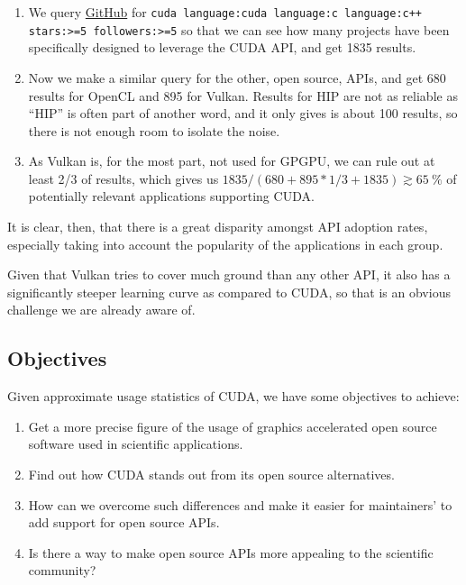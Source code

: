 \documentclass[11pt, conference, onecolumn, final]{IEEEtran}
\begin{document}
\begin{enumerate}
    \item We query \href{https://github.com}{GitHub} for
        \verb|cuda language:cuda language:c language:c++ stars:>=5 followers:>=5|
        so that we can see how many projects have been specifically designed to
        leverage the CUDA API, and get 1835 results.
    \item Now we make a similar query for the other, open source, APIs, and get
        680 results for OpenCL and 895 for Vulkan. Results for HIP are not as
        reliable as ``HIP'' is often part of another word, and it only gives is
        about 100 results, so there is not enough room to isolate the noise.
    \item As Vulkan is, for the most part, not used for GPGPU, we can rule out
        at least 2/3 of results, which gives us $ 1835 / (680 + 895 * 1/3 +
        1835) \gtrsim \qty{65}{\percent} $ of potentially relevant applications
        supporting CUDA.
\end{enumerate}

It is clear, then, that there is a great disparity amongst API adoption rates,
especially taking into account the popularity of the applications in each
group.

Given that Vulkan tries to cover much ground than any other API, it also has a
significantly steeper learning curve as compared to CUDA, so that is an obvious
challenge we are already aware of.

\subsection{Objectives} \label{sec:intro:objectives}

Given approximate usage statistics of CUDA, we have some objectives to achieve:

\begin{enumerate}
    \item\label{obj1} Get a more precise figure of the usage of graphics
        accelerated open source software used in scientific applications.
    \item\label{obj2} Find out how CUDA stands out from its open source
        alternatives.
    \item\label{obj3} How can we overcome such differences and make it easier
        for maintainers' to add support for open source APIs.
    \item\label{obj4} Is there a way to make open source APIs more appealing to
        the scientific community?
\end{enumerate}
\end{document}
